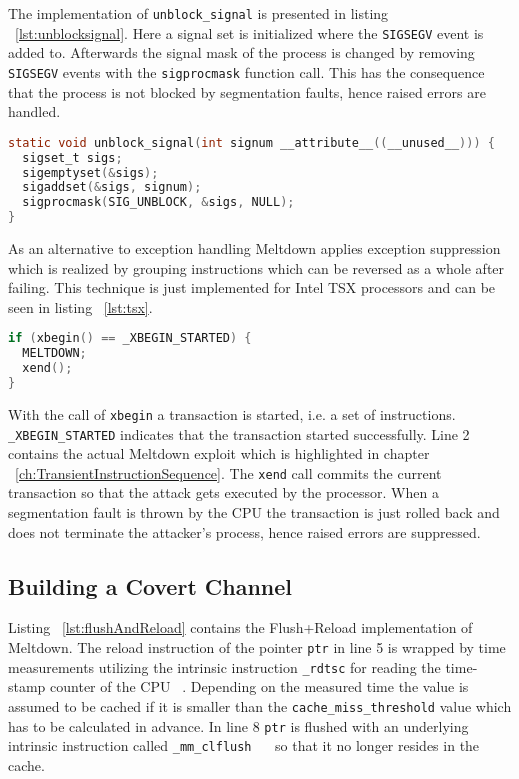 \documentclass[a4paper,oneside,openright] {scrreprt}
\begin{document}
The implementation of \texttt{unblock\_signal} is presented in listing ~\ref{lst:unblocksignal}. 
Here a signal set is initialized where the \texttt{SIGSEGV} event is added to.
Afterwards the signal mask of the process is changed by removing \texttt{SIGSEGV} events with the \texttt{sigprocmask} function call.
This has the consequence that the process is not blocked by segmentation faults, hence raised errors are handled.

\begin{lstlisting}[language=C, caption=Meltdown: Exception Handling 2, label={lst:unblocksignal}]
static void unblock_signal(int signum __attribute__((__unused__))) {
  sigset_t sigs;
  sigemptyset(&sigs);
  sigaddset(&sigs, signum);
  sigprocmask(SIG_UNBLOCK, &sigs, NULL);
}
\end{lstlisting}

As an alternative to exception handling Meltdown applies exception suppression which is realized by grouping instructions
which can be reversed as a whole after failing.
This technique is just implemented for Intel TSX processors and can be seen in listing ~\ref{lst:tsx}.

\begin{lstlisting}[language=C, caption=Meltdown: Exception Suppression on Intel TSX, label={lst:tsx}]
if (xbegin() == _XBEGIN_STARTED) {
  MELTDOWN;
  xend();
}
\end{lstlisting}

With the call of \texttt{xbegin} a transaction is started, i.e. a set of instructions.
\texttt{\_XBEGIN\_STARTED} indicates that the transaction started successfully.
Line 2 contains the actual Meltdown exploit which is highlighted in chapter ~\ref{ch:TransientInstructionSequence}.
The \texttt{xend} call commits the current transaction so that the attack gets executed by the processor.
When a segmentation fault is thrown by the CPU the transaction is just rolled back and does not terminate the attacker's process,
hence raised errors are suppressed.

\subsection{Building a Covert Channel}
\label{ch:intro:motivation:A}

Listing ~\ref{lst:flushAndReload} contains the Flush+Reload implementation of Meltdown. 
The reload instruction of the pointer \texttt{ptr} in line 5 is wrapped 
by time measurements utilizing the intrinsic instruction \texttt{\_rdtsc} for reading the time-stamp counter of the CPU ~\cite{intelintrinsics}. 
Depending on the measured time the value is assumed to be cached if it is smaller
than the \texttt{cache\_miss\_threshold} value which has to be calculated in advance.
In line 8 \texttt{ptr} is flushed with an underlying intrinsic instruction called \texttt{\_mm\_clflush } ~\cite{intelintrinsics}
so that it no longer resides in the cache.
\end{document}

